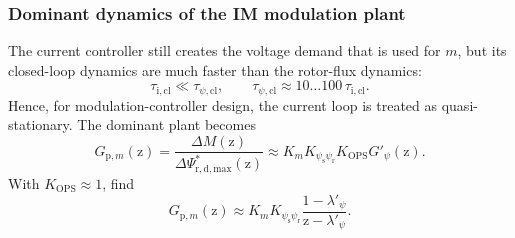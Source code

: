 \begin{frame}
    \frametitle{Dominant dynamics of the IM modulation plant}
    The current controller still creates the voltage demand that is used for $m$, but its closed-loop dynamics are much faster than the rotor-flux dynamics:
    \begin{equation}
        \tau_{\mathrm{i,cl}}\ll\tau_{\psi,\mathrm{cl}},
        \qquad
        \tau_{\psi,\mathrm{cl}}\approx 10\ldots100\,\tau_{\mathrm{i,cl}} .
        \label{eq:IM_mod_v06_time_scale}
    \end{equation}\pause%
    Hence, for modulation-controller design, the current loop is treated as quasi-stationary.  The dominant plant becomes
    \begin{equation}
        G_{\mathrm{p},m}(\mathrm{z})
        =\frac{\Delta M(\mathrm{z})}{\Delta\Psi_{\mathrm{r,d,max}}^{*}(\mathrm{z})}
        \approx
        K_mK_{\psi_{\mathrm{s}}\psi_{\mathrm r}}K_{\mathrm{OPS}}G'_{\psi}(\mathrm{z}) .
        \label{eq:IM_mod_v06_flux_dominant_plant}
    \end{equation}\pause%
    With $K_{\mathrm{OPS}}\approx1$, find
    \begin{equation}
        G_{\mathrm{p},m}(\mathrm{z})
        \approx K_mK_{\psi_{\mathrm{s}}\psi_{\mathrm r}}\frac{1-\lambda'_{\psi}}{\mathrm{z}-\lambda'_{\psi}} .
        \label{eq:IM_mod_v06_reduced_rotor_plant}
    \end{equation}
\end{frame}

